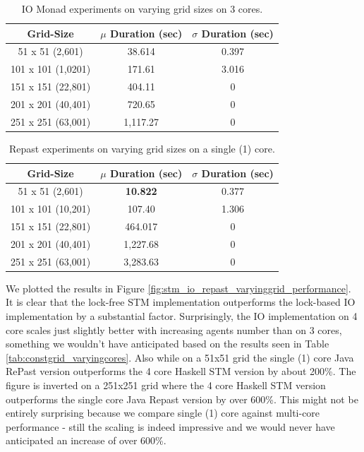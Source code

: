 \begin{table}
	\centering
  	\begin{tabular}{ c || c | c }
        Grid-Size         & $\mu$ Duration (sec) & $\sigma$ Duration (sec) \\ \hline \hline 
   		51 x 51   (2,601)  & 38.614 			 & 0.397 \\ \hline
   		101 x 101 (1,0201) & 171.61 			 & 3.016 \\ \hline
   		151 x 151 (22,801) & 404.11				 & 0 \\ \hline
   		201 x 201 (40,401) & 720.65 			 & 0 \\ \hline 
   		251 x 251 (63,001) & 1,117.27 			 & 0 \\ \hline 
  	\end{tabular}
  	
  	\caption{IO Monad experiments on varying grid sizes on 3 cores.}
	\label{tab:varyinggrid_constcores3_IO}
\end{table}

\begin{table}
	\centering
  	\begin{tabular}{ c || c | c }
        Grid-Size          & $\mu$ Duration (sec) & $\sigma$ Duration (sec) \\ \hline \hline 
   		51 x 51 (2,601)    & \textbf{10.822}     & 0.377 \\ \hline
   		101 x 101 (10,201) & 107.40 		     & 1.306 \\ \hline
   		151 x 151 (22,801) & 464.017      		 & 0 \\ \hline
   		201 x 201 (40,401) & 1,227.68 			 & 0 \\ \hline 
   		251 x 251 (63,001) & 3,283.63			 & 0 \\ \hline 
  	\end{tabular}
  	
  	\caption{Repast experiments on varying grid sizes on a single (1) core.}
	\label{tab:varyinggrid_constcores_repast}
\end{table}

We plotted the results in Figure \ref{fig:stm_io_repast_varyinggrid_performance}. It is clear that the lock-free STM implementation outperforms the lock-based IO implementation by a substantial factor. Surprisingly, the IO implementation on 4 core scales just slightly better with increasing agents number than on 3 cores, something we wouldn't have anticipated based on the results seen in Table \ref{tab:constgrid_varyingcores}. Also  while on a 51x51 grid the single (1) core Java RePast version outperforms the 4 core Haskell STM version by about 200\%. The figure is inverted on a 251x251 grid where the 4 core Haskell STM version outperforms the single core Java Repast version by over 600\%. This might not be entirely surprising because we compare single (1) core against multi-core performance - still the scaling is indeed impressive and we would never have anticipated an increase of over 600\%.

